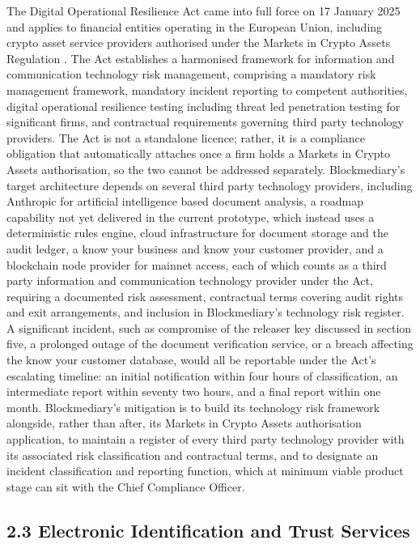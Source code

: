 \documentclass[12pt, a4paper]{article}
\begin{document}
The Digital Operational Resilience Act came into full force on 17 January 2025 and applies
to financial entities operating in the European Union, including crypto asset service
providers authorised under the Markets in Crypto Assets Regulation \citep{dora2022}. The
Act establishes a harmonised framework for information and communication technology risk
management, comprising a mandatory risk management framework, mandatory incident
reporting to competent authorities, digital operational resilience testing including
threat led penetration testing for significant firms, and contractual requirements
governing third party technology providers. The Act is not a standalone licence; rather,
it is a compliance obligation that automatically attaches once a firm holds a Markets in
Crypto Assets authorisation, so the two cannot be addressed separately. Blockmediary's
target architecture depends on several third party technology providers, including
Anthropic for artificial intelligence based document analysis, a roadmap capability not
yet delivered in the current prototype, which instead uses a deterministic rules engine,
cloud infrastructure for document storage and the audit ledger, a know your business and
know your customer provider, and a blockchain node provider for mainnet access, each of
which counts as a third party
information and communication technology provider under the Act, requiring a documented
risk assessment, contractual terms covering audit rights and exit arrangements, and
inclusion in Blockmediary's technology risk register. A significant incident, such as
compromise of the releaser key discussed in section five, a prolonged outage of the
document verification service, or a breach affecting the know your customer database,
would all be reportable under the Act's escalating timeline: an initial notification
within four hours of classification, an intermediate report within seventy two hours, and
a final report within one month. Blockmediary's mitigation is to build its technology risk
framework alongside, rather than after, its Markets in Crypto Assets authorisation
application, to maintain a register of every third party technology provider with its
associated risk classification and contractual terms, and to designate an incident
classification and reporting function, which at minimum viable product stage can sit with
the Chief Compliance Officer.

\subsection*{2.3 Electronic Identification and Trust Services}
\end{document}
